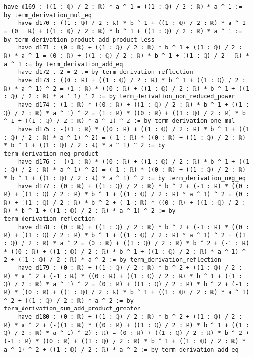 \documentclass{article}
\begin{document}
\begin{tcolorbox}[colback=white!10, width=\linewidth]
\begin{lstlisting}[language=Lean4]
    have d169 : ((1 : ℚ) / 2 : ℝ) * a ^ 1 = ((1 : ℚ) / 2 : ℝ) * a ^ 1 := by term_derivation_mul_eq
    have d170 : ((1 : ℚ) / 2 : ℝ) * b ^ 1 + ((1 : ℚ) / 2 : ℝ) * a ^ 1 = (0 : ℝ) + ((1 : ℚ) / 2 : ℝ) * b ^ 1 + ((1 : ℚ) / 2 : ℝ) * a ^ 1 := by term_derivation_product_add_product_less
    have d171 : (0 : ℝ) + ((1 : ℚ) / 2 : ℝ) * b ^ 1 + ((1 : ℚ) / 2 : ℝ) * a ^ 1 = (0 : ℝ) + ((1 : ℚ) / 2 : ℝ) * b ^ 1 + ((1 : ℚ) / 2 : ℝ) * a ^ 1 := by term_derivation_add_eq
    have d172 : 2 = 2 := by term_derivation_reflection
    have d173 : ((0 : ℝ) + ((1 : ℚ) / 2 : ℝ) * b ^ 1 + ((1 : ℚ) / 2 : ℝ) * a ^ 1) ^ 2 = (1 : ℝ) * ((0 : ℝ) + ((1 : ℚ) / 2 : ℝ) * b ^ 1 + ((1 : ℚ) / 2 : ℝ) * a ^ 1) ^ 2 := by term_derivation_non_reduced_power
    have d174 : (1 : ℝ) * ((0 : ℝ) + ((1 : ℚ) / 2 : ℝ) * b ^ 1 + ((1 : ℚ) / 2 : ℝ) * a ^ 1) ^ 2 = (1 : ℝ) * ((0 : ℝ) + ((1 : ℚ) / 2 : ℝ) * b ^ 1 + ((1 : ℚ) / 2 : ℝ) * a ^ 1) ^ 2 := by term_derivation_one_mul
    have d175 : -((1 : ℝ) * ((0 : ℝ) + ((1 : ℚ) / 2 : ℝ) * b ^ 1 + ((1 : ℚ) / 2 : ℝ) * a ^ 1) ^ 2) = (-1 : ℝ) * ((0 : ℝ) + ((1 : ℚ) / 2 : ℝ) * b ^ 1 + ((1 : ℚ) / 2 : ℝ) * a ^ 1) ^ 2 := by term_derivation_neg_product
    have d176 : -((1 : ℝ) * ((0 : ℝ) + ((1 : ℚ) / 2 : ℝ) * b ^ 1 + ((1 : ℚ) / 2 : ℝ) * a ^ 1) ^ 2) = (-1 : ℝ) * ((0 : ℝ) + ((1 : ℚ) / 2 : ℝ) * b ^ 1 + ((1 : ℚ) / 2 : ℝ) * a ^ 1) ^ 2 := by term_derivation_neg_eq
    have d177 : (0 : ℝ) + ((1 : ℚ) / 2 : ℝ) * b ^ 2 + (-1 : ℝ) * ((0 : ℝ) + ((1 : ℚ) / 2 : ℝ) * b ^ 1 + ((1 : ℚ) / 2 : ℝ) * a ^ 1) ^ 2 = (0 : ℝ) + ((1 : ℚ) / 2 : ℝ) * b ^ 2 + (-1 : ℝ) * ((0 : ℝ) + ((1 : ℚ) / 2 : ℝ) * b ^ 1 + ((1 : ℚ) / 2 : ℝ) * a ^ 1) ^ 2 := by term_derivation_reflection
    have d178 : (0 : ℝ) + ((1 : ℚ) / 2 : ℝ) * b ^ 2 + (-1 : ℝ) * ((0 : ℝ) + ((1 : ℚ) / 2 : ℝ) * b ^ 1 + ((1 : ℚ) / 2 : ℝ) * a ^ 1) ^ 2 + ((1 : ℚ) / 2 : ℝ) * a ^ 2 = (0 : ℝ) + ((1 : ℚ) / 2 : ℝ) * b ^ 2 + (-1 : ℝ) * ((0 : ℝ) + ((1 : ℚ) / 2 : ℝ) * b ^ 1 + ((1 : ℚ) / 2 : ℝ) * a ^ 1) ^ 2 + ((1 : ℚ) / 2 : ℝ) * a ^ 2 := by term_derivation_reflection
    have d179 : (0 : ℝ) + ((1 : ℚ) / 2 : ℝ) * b ^ 2 + ((1 : ℚ) / 2 : ℝ) * a ^ 2 + (-1 : ℝ) * ((0 : ℝ) + ((1 : ℚ) / 2 : ℝ) * b ^ 1 + ((1 : ℚ) / 2 : ℝ) * a ^ 1) ^ 2 = (0 : ℝ) + ((1 : ℚ) / 2 : ℝ) * b ^ 2 + (-1 : ℝ) * ((0 : ℝ) + ((1 : ℚ) / 2 : ℝ) * b ^ 1 + ((1 : ℚ) / 2 : ℝ) * a ^ 1) ^ 2 + ((1 : ℚ) / 2 : ℝ) * a ^ 2 := by term_derivation_sum_add_product_greater
    have d180 : (0 : ℝ) + ((1 : ℚ) / 2 : ℝ) * b ^ 2 + ((1 : ℚ) / 2 : ℝ) * a ^ 2 + (-((1 : ℝ) * ((0 : ℝ) + ((1 : ℚ) / 2 : ℝ) * b ^ 1 + ((1 : ℚ) / 2 : ℝ) * a ^ 1) ^ 2) : ℝ) = (0 : ℝ) + ((1 : ℚ) / 2 : ℝ) * b ^ 2 + (-1 : ℝ) * ((0 : ℝ) + ((1 : ℚ) / 2 : ℝ) * b ^ 1 + ((1 : ℚ) / 2 : ℝ) * a ^ 1) ^ 2 + ((1 : ℚ) / 2 : ℝ) * a ^ 2 := by term_derivation_add_eq

\end{lstlisting}
\end{tcolorbox}
\end{document}
